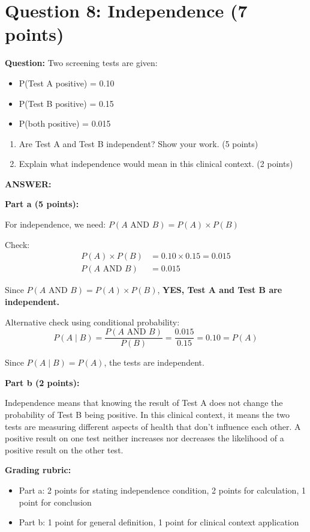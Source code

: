 \documentclass[11pt]{article}
\begin{document}
\vspace{0.3cm}
\noindent\hrulefill

\section*{Question 8: Independence (7 points)}

\textbf{Question:} Two screening tests are given:
\begin{itemize}
    \item P(Test A positive) = 0.10
    \item P(Test B positive) = 0.15
    \item P(both positive) = 0.015
\end{itemize}

\begin{enumerate}
    \item[a)] Are Test A and Test B independent? Show your work. (5 points)
    \item[b)] Explain what independence would mean in this clinical context. (2 points)
\end{enumerate}

\textbf{ANSWER:}

\textbf{Part a (5 points):}

For independence, we need: $P(A \text{ AND } B) = P(A) \times P(B)$

Check:
\begin{align*}
P(A) \times P(B) &= 0.10 \times 0.15 = 0.015\\
P(A \text{ AND } B) &= 0.015
\end{align*}

Since $P(A \text{ AND } B) = P(A) \times P(B)$, \textbf{YES, Test A and Test B are independent.}

Alternative check using conditional probability:
\[P(A \mid B) = \frac{P(A \text{ AND } B)}{P(B)} = \frac{0.015}{0.15} = 0.10 = P(A)\]

Since $P(A \mid B) = P(A)$, the tests are independent.

\textbf{Part b (2 points):}

Independence means that knowing the result of Test A does not change the probability of Test B being positive. In this clinical context, it means the two tests are measuring different aspects of health that don't influence each other. A positive result on one test neither increases nor decreases the likelihood of a positive result on the other test.

\textbf{Grading rubric:}
\begin{itemize}
    \item Part a: 2 points for stating independence condition, 2 points for calculation, 1 point for conclusion
    \item Part b: 1 point for general definition, 1 point for clinical context application
\end{itemize}
\end{document}
